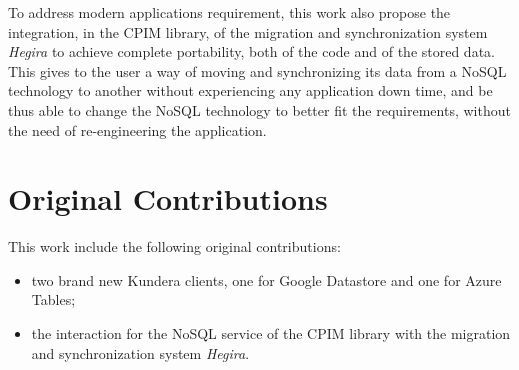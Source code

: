 \noindent To address modern applications requirement, this work also propose the integration, in the CPIM library, of the migration and synchronization system \textit{Hegira} to achieve complete portability, both of the code and of the stored data. This gives to the user a way of moving and synchronizing its data from a NoSQL technology to another without experiencing any application down time, and be thus able to change the NoSQL technology to better fit the requirements, without the need of re-engineering the application.
 
\section*{Original Contributions}
This work include the following original contributions:
\begin{itemize}
\item two brand new Kundera clients, one for Google Datastore and one for Azure Tables;
\item the interaction for the NoSQL service of the CPIM library with the migration and synchronization system \textit{Hegira}.
\end{itemize}


